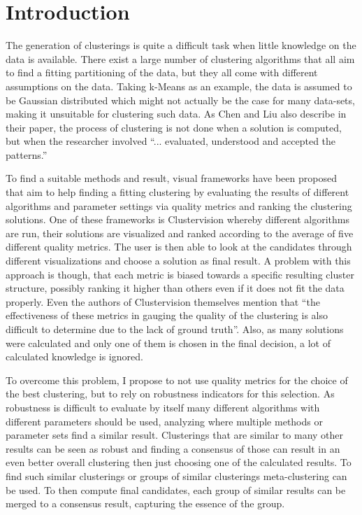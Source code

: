 \iffalse  \fi

\chapter{Introduction}
\label{cha:Introduction}

The generation of clusterings is quite a difficult task when little knowledge on the data is available. There exist a large number of clustering algorithms that all aim to find a fitting partitioning of the data, but they all come with different assumptions on the data. Taking k-Means as an example, the data is assumed to be Gaussian distributed which might not actually be the case for many data-sets, making it unsuitable for clustering such data. As Chen and Liu \cite{VISTA} also describe in their paper, the process of clustering is not done when a solution is computed, but when the researcher involved ``... evaluated, understood and accepted the patterns.''

To find a suitable methods and result, visual frameworks have been proposed that aim to help finding a fitting clustering by evaluating the results of different algorithms and parameter settings via quality metrics and ranking the clustering solutions. One of these frameworks is Clustervision \cite{Kwon2018ClustervisionVS} whereby different algorithms are run, their solutions are visualized and ranked according to the average of five different quality metrics. The user is then able to look at the candidates through different visualizations and choose a solution as final result. A problem with this approach is though, that each metric is biased towards a specific resulting cluster structure, possibly ranking it higher than others even if it does not fit the data properly. Even the authors of Clustervision themselves mention that ``the effectiveness of these metrics in gauging the quality of the clustering is also difficult to determine due to the lack of ground truth''. Also, as many solutions were calculated and only one of them is chosen in the final decision, a lot of calculated knowledge is ignored.

To overcome this problem, I propose to not use quality metrics for the choice of the best clustering, but to rely on robustness indicators for this selection. As robustness is difficult to evaluate by itself many different algorithms with different parameters should be used, analyzing where multiple methods or parameter sets find a similar result. Clusterings that are similar to many other results can be seen as robust and finding a consensus of those can result in an even better overall clustering then just choosing one of the calculated results. To find such similar clusterings or groups of similar clusterings meta-clustering can be used. To then compute final candidates, each group of similar results can be merged to a consensus result, capturing the essence of the group. 


